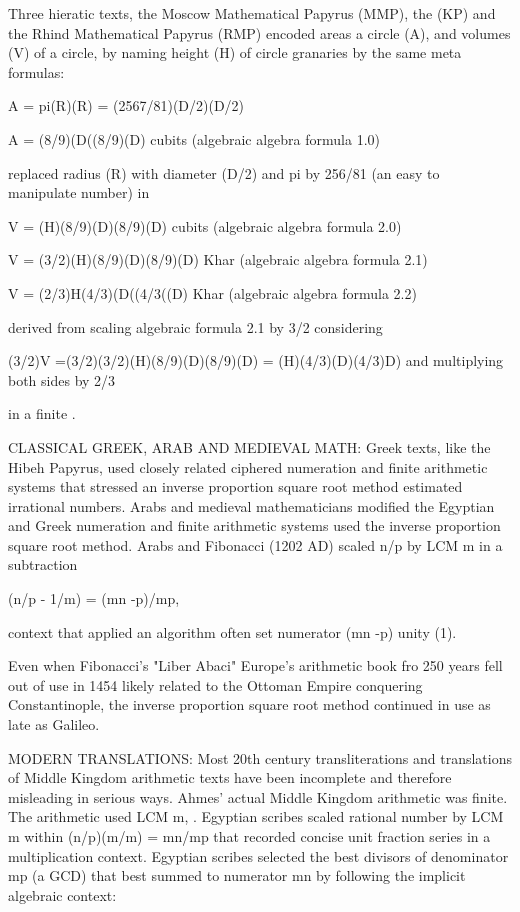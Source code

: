 \documentclass[12pt]{article}
\begin{document}
Three hieratic texts, the Moscow Mathematical Papyrus (MMP), the (KP) and the Rhind Mathematical Papyrus (RMP) encoded areas a circle (A), and volumes (V) of a circle, by naming height (H) of circle granaries by the same meta formulas: 

A = pi(R)(R) = (2567/81)(D/2)(D/2)  

A = (8/9)(D((8/9)(D) cubits (algebraic algebra formula 1.0)

replaced radius (R) with diameter (D/2) and pi by 256/81 (an easy to manipulate number) in

V  = (H)(8/9)(D)(8/9)(D) cubits (algebraic algebra formula 2.0)

V  = (3/2)(H)(8/9)(D)(8/9)(D) Khar (algebraic algebra formula 2.1)

V = (2/3)H(4/3)(D((4/3((D) Khar (algebraic algebra formula 2.2)

derived from scaling algebraic formula 2.1 by 3/2 considering

(3/2)V  =(3/2)(3/2)(H)(8/9)(D)(8/9)(D) = (H)(4/3)(D)(4/3)D) and multiplying both sides by 2/3

in a finite .

CLASSICAL GREEK, ARAB AND MEDIEVAL MATH:  Greek texts, like the Hibeh Papyrus, used closely related ciphered numeration and finite arithmetic systems that stressed an inverse proportion square root method estimated irrational numbers.  Arabs and medieval mathematicians modified the Egyptian and Greek numeration and finite arithmetic systems used the inverse proportion square root method. Arabs and Fibonacci (1202 AD) scaled n/p by LCM m in a subtraction 

(n/p - 1/m) = (mn -p)/mp,  

context that applied an algorithm often set numerator (mn -p) unity (1). 

Even when Fibonacci's "Liber Abaci" Europe's arithmetic book fro 250 years fell out of use in 1454 likely related to the Ottoman Empire conquering Constantinople, the inverse proportion square root method continued in use as late as Galileo.

MODERN TRANSLATIONS: Most 20th century transliterations and translations of Middle Kingdom arithmetic texts have been incomplete and therefore misleading in serious ways. Ahmes' actual Middle Kingdom arithmetic was finite. The arithmetic used LCM m, . Egyptian scribes scaled rational number by LCM m within (n/p)(m/m) = mn/mp that recorded concise unit fraction series in a multiplication context. Egyptian scribes selected the best divisors of denominator mp (a GCD) that best summed to numerator mn by following the implicit algebraic context:
\end{document}
